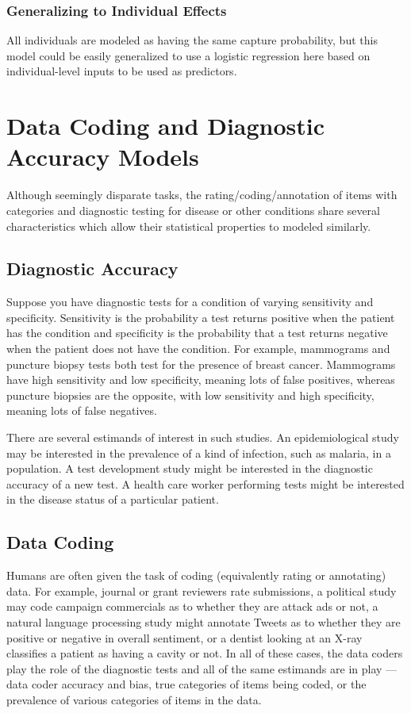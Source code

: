\subsubsection{Generalizing to Individual Effects}

All individuals are modeled as having the same capture probability,
but this model could be easily generalized to use a logistic
regression here based on individual-level inputs to be used as
predictors.



\section{Data Coding and Diagnostic Accuracy Models}

Although seemingly disparate tasks, the rating/coding/annotation of
items with categories and diagnostic testing for disease or other
conditions share several characteristics which allow their statistical
properties to modeled similarly.

\subsection{Diagnostic Accuracy}

Suppose you have diagnostic tests for a condition of varying
sensitivity and specificity.  Sensitivity is the probability a test
returns positive when the patient has the condition and specificity is
the probability that a test returns negative when the patient does not
have the condition.  For example, mammograms and puncture biopsy tests
both test for the presence of breast cancer.  Mammograms have high
sensitivity and low specificity, meaning lots of false positives,
whereas puncture biopsies are the opposite, with low sensitivity and
high specificity, meaning lots of false negatives.

There are several estimands of interest in such studies.  An
epidemiological study may be interested in the prevalence of a kind of
infection, such as malaria, in a population.  A test development study
might be interested in the diagnostic accuracy of a new test. A health
care worker performing tests might be interested in the disease status
of a particular patient.

\subsection{Data Coding}

Humans are often given the task of coding (equivalently rating or
annotating) data.  For example, journal or grant reviewers rate
submissions, a political study may code campaign commercials as to
whether they are attack ads or not, a natural language processing
study might annotate Tweets as to whether they are positive or
negative in overall sentiment, or a dentist looking at an X-ray
classifies a patient as having a cavity or not.  In all of these
cases, the data coders play the role of the diagnostic tests and all
of the same estimands are in play --- data coder accuracy and bias,
true categories of items being coded, or the prevalence of various
categories of items in the data.

